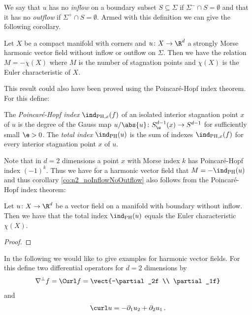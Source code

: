 We say that $u$ has no \emph{inflow} on a boundary subset $S\subseteq\Sigma$ if $\Sigma^-\cap S=\emptyset$ and
that it has no \emph{outflow} if $\Sigma^+\cap S=\emptyset$.
Armed with this definition we can give the following corollary.
\begin{corollary}\label{co:n2_noInflowNoOutflow}
  Let $X$ be a compact manifold with corners and $u\colon X\to\R^d$ a strongly Morse
  harmonic vector field without inflow or outflow on
  $\Sigma$. Then we have the relation $M=-\chi(X)$ where $M$ is the number of stagnation points
  and $\chi(X)$ is the Euler characteristic of $X$.
\end{corollary}
This result could also have been proved using the Poincaré-Hopf index theorem.
For this define:
\begin{definition}
  The \emph{Poincaré-Hopf index} $\ind_{\text{PH},x}(f)$ of an isolated
  interior stagnation point $x$ of $u$ is the degree of the Gauss map $u/\abs{u}\colon S^{d-1}_\e(x)\to S^{d-1}$
   for sufficiently small $\e>0$.
  The \emph{total index} $\ind_{\text{PH}}(u)$ is the sum of indexes $\ind_{\text{PH},x}(f)$
  for every interior stagnation point $x$ of $u$.
\end{definition}
Note that in $d=2$ dimensions a point $x$ with Morse index $k$ has Poincaré-Hopf index $(-1)^k$.
Thus we have for a harmonic vector field that $M=-\ind_\text{PH}(u)$ and thus corollary \ref{co:n2_noInflowNoOutflow}
also follows from the Poincaré-Hopf index theorem:
\begin{theorem}
  Let $u\colon X\to\R^d$ be a vector field on a manifold with boundary without inflow. Then we have
  that the total index $\ind_\text{PH}(u)$ equals the Euler characteristic $\chi(X)$.
\end{theorem}
\begin{proof}
\end{proof}


In the following we would like to give examples for harmonic vector fields.
For this define two differential operators for $d=2$ dimensions by
\begin{align*}
  \nabla^\perp f=\Curl f=\vect{-\partial_2f \\ \partial_1f}
\end{align*}
and
\begin{align*}
  \curl u=-\partial_1u_2+\partial_2u_1\,.
\end{align*}

